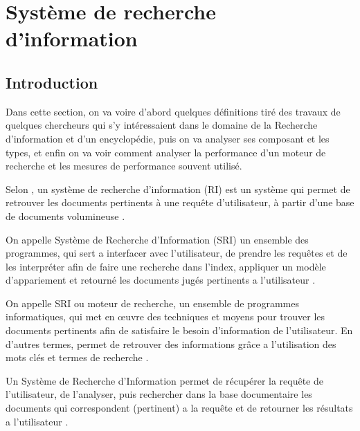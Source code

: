 \chapter{Système de recherche d'information}
\section{Introduction}
Dans cette section, on va voire d'abord quelques définitions tiré des travaux de quelques chercheurs qui s'y intéressaient dans le domaine de la Recherche d'information et d'un encyclopédie, puis on va analyser ses composant et les types, et enfin on va voir comment analyser la performance d'un moteur de recherche et les mesures de performance souvent utilisé.

\begin{definition}
    Selon \citeauthor{salton1989automatique}, un système de recherche d'information (RI) est un système qui permet de retrouver les documents pertinents à une requête d'utilisateur, à partir d'une base de documents volumineuse \citep{salton1989automatique}.
\end{definition}

\begin{definition}
	On appelle Système de Recherche d'Information (SRI) un ensemble des programmes, qui sert a interfacer avec l'utilisateur, de prendre les requêtes et de les interpréter afin de faire une recherche dans l'index, appliquer un modèle d’appariement et retourné les documents jugés pertinents a l'utilisateur \citep{amelioration-ri-approche-semantique}.
\end{definition}

\begin{definition}
	On appelle SRI ou moteur de recherche, un ensemble de programmes informatiques, qui met en œuvre des techniques et moyens pour trouver les documents pertinents afin de satisfaire le besoin d'information de l'utilisateur. En d'autres termes, permet de retrouver des informations grâce a l'utilisation des mots clés et termes de recherche \citep{approche-semantique}.
\end{definition}

\begin{definition}
	Un Système de Recherche d'Information permet de récupérer la requête de l'utilisateur, de l'analyser, puis rechercher dans la base documentaire les documents qui correspondent (pertinent) a la requête et de retourner les résultats a l'utilisateur \citep{vsm}.
\end{definition}

